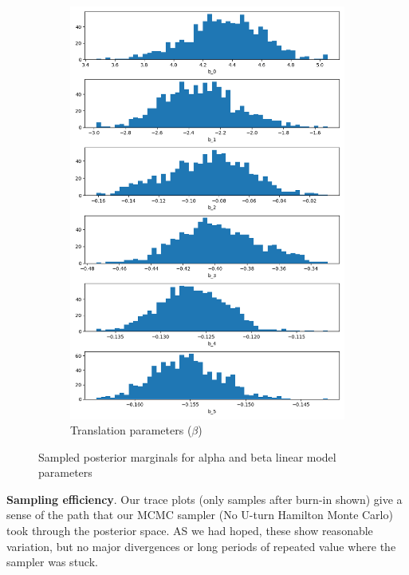 \documentclass{article}
\begin{document}
\begin{figure}[H]
\begin{subfigure}[b]{0.49\linewidth}
            \includegraphics[width=\linewidth]{figs/bayes_beta_sampled_histogram.png}
            \caption{Translation parameters ($\beta$)}
        \end{subfigure}
        \caption{Sampled posterior marginals for alpha and beta linear model parameters}
        \label{fig:bayeshist}
    \end{figure}

\newpage
\textbf{Sampling efficiency}. Our trace plots (only samples after burn-in shown) give a sense of the path that our MCMC sampler (No U-turn Hamilton Monte Carlo) took through the posterior space. AS we had hoped, these show reasonable variation, but no major divergences or long periods of repeated value where the sampler was stuck.
\end{document}
